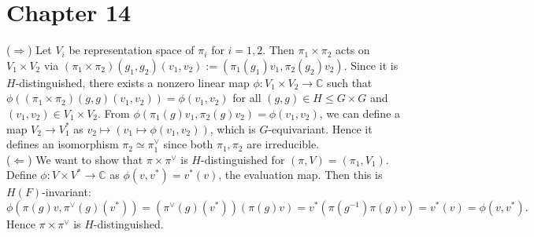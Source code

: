 \newpage
\section{Chapter 14}

\begin{problem} \notfinish
\end{problem}

\begin{problem} \notfinish
\end{problem}

\begin{problem} \notfinish
\end{problem}

\begin{problem}
($\Rightarrow$) Let $V_i$ be representation space of $\pi_i$ for $i = 1, 2$.
Then $\pi_1 \times \pi_2$ acts on $V_1 \times V_2$ via $(\pi_1 \times \pi_2)(g_1, g_2)(v_1, v_2) := (\pi_1(g_1)v_1, \pi_2(g_2)v_2)$.
Since it is $H$-distinguished, there exists a nonzero linear map $\phi: V_1 \times V_2 \to \mathbb{C}$ such that 
$\phi((\pi_1 \times \pi_2)(g, g)(v_1, v_2)) = \phi(v_1, v_2)$ for all $(g, g) \in H \leq G \times G$ and $(v_1, v_2) \in V_1 \times V_2$.
From $\phi(\pi_1(g)v_1, \pi_2(g)v_2) = \phi(v_1, v_2)$, we can define a map $V_2 \to V_1^{*}$ as
$v_2 \mapsto (v_1 \mapsto \phi(v_1, v_2))$, which is $G$-equivariant.
Hence it defines an isomorphism  $\pi_2 \simeq \pi_1^{\vee}$ since both $\pi_1, \pi_2$ are irreducible. \\
($\Leftarrow$) We want to show that $\pi \times \pi^{\vee}$ is $H$-distinguished for $(\pi, V)= (\pi_1, V_1)$.
Define $\phi: V \times V^{*} \to \mathbb{C}$ as $\phi(v, v^{*}) = v^{*}(v)$, the evaluation map.
Then this is $H(F)$-invariant:
$$
\phi(\pi(g)v, \pi^{\vee}(g)(v^{*})) = (\pi^{\vee}(g)(v^{*}))(\pi(g)v) = v^{*}(\pi(g^{-1})\pi(g)v) = v^{*}(v) = \phi(v, v^*).
$$
Hence $\pi \times \pi^\vee$ is $H$-distinguished.
\end{problem}

\begin{problem} \notfinish
\end{problem}

\begin{problem} \notfinish
\end{problem}

\begin{problem} \notfinish
\end{problem}

\begin{problem} \notfinish
\end{problem}

\begin{problem} \notfinish
\end{problem}